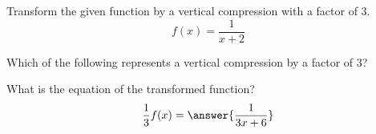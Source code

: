 \documentclass{ximera}
\author{Ivo Terek}
\begin{document}
Transform the given function by a vertical compression with a factor of $3$.
\[
f(x)=\frac{1}{x+2}
\]
\begin{exercise}
Which of the following represents a vertical compression by a factor of $3$?
\begin{multipleChoice}
\end{multipleChoice}

\begin{exercise}
What is the equation of the transformed function?
\[
\frac{1}{3}f(x)=\answer{\frac{1}{3x+6}}
\]
\end{exercise}
\end{exercise}
\end{document}
